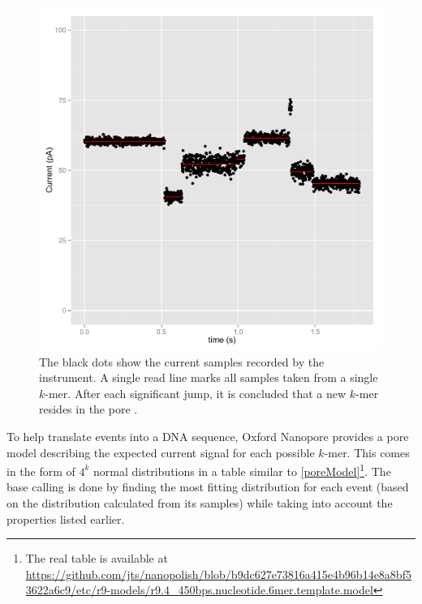 \documentclass[times, utf, seminar]{fer}
\begin{document}
\begin{figure}[H]
	\begin{mdframed}[roundcorner=7pt]                                
	\centerline{\includegraphics[scale=0.8, clip]{simulation.pdf}}%
	\caption{The black dots show the current samples recorded by the instrument. A single
	read line marks all samples taken from a single $k$-mer. After each significant jump,
	it is concluded that a new $k$-mer resides in the pore \citep{simpson}.}
	\label{sampling}
	\end{mdframed}                                                  
\end{figure}  

To help translate events into a DNA sequence, Oxford Nanopore provides a pore model describing the expected current signal for each possible $k$-mer. This comes in the form of $4^k$ normal distributions in a table similar to \ref{poreModel}\footnote{The real table is available at \url{https://github.com/jts/nanopolish/blob/b9dc627e73816a415e4b96b14e8a8bf53622a6c9/etc/r9-models/r9.4_450bps.nucleotide.6mer.template.model}}. The base calling is done by finding the most fitting distribution for each event (based on the distribution calculated from its samples) while taking into account the properties listed earlier.
\end{document}

